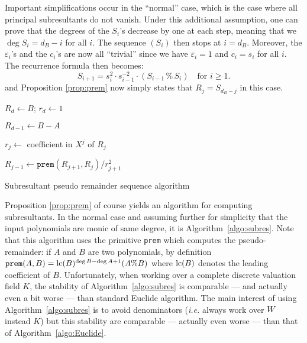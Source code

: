 \documentclass{article}
\begin{document}
Important simplifications occur in the ``normal'' case, which is the 
case where all principal subresultants do not vanish. Under this 
additional assumption, one can prove that the degrees of the $S_i$'s 
decrease by one at each step, meaning that we $\deg S_i = d_B - i$ for 
all $i$. The sequence $(S_i)$ then stops at $i = d_B$. Moreover, the 
$\varepsilon_i$'s and the $c_i$'s are now all ``trivial'' since we have 
$\varepsilon_i = 1$ and $c_i = s_i$ for all $i$. The recurrence formula 
then becomes:
$$S_{i+1} = s_i^2 \cdot s_{i-1}^{-2}
\cdot (S_{i-1} \,\%\, S_i) \quad \text{for } i \geq 1.$$
and Proposition \ref{prop:prem} now simply states that $R_j = S_{d_B-j}$ 
in this case.

\begin{algorithm}

  \BlankLine

  $R_d \leftarrow B$; $r_d \leftarrow 1$

  $R_{d-1} \leftarrow B-A$

    {$r_j \leftarrow$ coefficient in $X^j$ of $R_j$


     $R_{j-1} \leftarrow \texttt{prem}(R_{j+1}, R_j) / r_{j+1}^2$
    }

\caption{Subresultant pseudo remainder sequence algorithm}
\label{algo:subres}
\end{algorithm}

Proposition \ref{prop:prem} of course yields an algorithm for computing 
subresultants. In the normal case and assuming further for simplicity 
that the input polynomials are monic of same degree, it is 
Algorithm~\ref{algo:subres}. Note that this algorithm uses the primitive 
\texttt{prem} which computes the pseudo-remainder: if $A$ and $B$ are 
two polynomials, by definition $\texttt{prem}(A,B) = \text{\rm lc}(B)^{\deg B-\deg 
A+1} (A \% B)$ where $\text{\rm lc}(B)$ denotes the leading coefficient of $B$. 
Unfortunately, when working over a complete discrete valuation field 
$K$, the stability of Algorithm~\ref{algo:subres} is comparable --- and 
actually even a bit worse --- than standard Euclide algorithm. The main 
interest of using Algorithm~\ref{algo:subres} is to avoid denominators 
(\emph{i.e.} always work over $W$ instead $K$) but this stability
are comparable --- actually even worse --- than that of 
Algorithm~\ref{algo:Euclide}.
\end{document}
